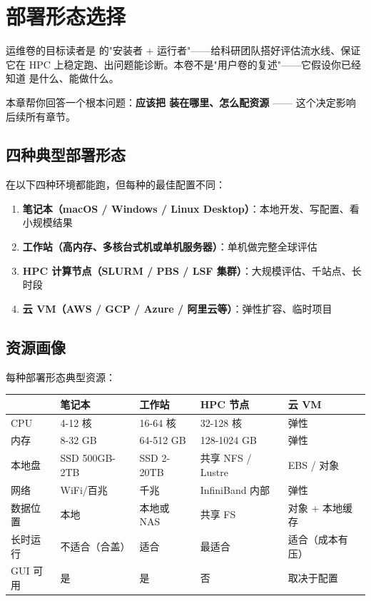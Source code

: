 
\chapter{部署形态选择}

运维卷的目标读者是 \openbench{} 的"安装者 + 运行者"——给科研团队搭好评估流水线、保证它在 HPC 上稳定跑、出问题能诊断。本卷不是"用户卷的复述"——它假设你已经知道 \openbench{} 是什么、能做什么。

本章帮你回答一个根本问题：\textbf{应该把 \openbench{} 装在哪里、怎么配资源} —— 这个决定影响后续所有章节。

\section{四种典型部署形态}

\openbench{} 在以下四种环境都能跑，但每种的最佳配置不同：

\begin{enumerate}
  \item \textbf{笔记本（macOS / Windows / Linux Desktop）}：本地开发、写配置、看小规模结果
  \item \textbf{工作站（高内存、多核台式机或单机服务器）}：单机做完整全球评估
  \item \textbf{HPC 计算节点（SLURM / PBS / LSF 集群）}：大规模评估、千站点、长时段
  \item \textbf{云 VM（AWS / GCP / Azure / 阿里云等）}：弹性扩容、临时项目
\end{enumerate}

\section{资源画像}

每种部署形态典型资源：

\begin{longtable}{p{2.4cm} p{2.4cm} p{2.4cm} p{2.4cm} p{2.4cm}}
  \toprule
  & 笔记本 & 工作站 & HPC 节点 & 云 VM \\
  \midrule
  \endhead
  CPU & 4-12 核 & 16-64 核 & 32-128 核 & 弹性 \\
  内存 & 8-32 GB & 64-512 GB & 128-1024 GB & 弹性 \\
  本地盘 & SSD 500GB-2TB & SSD 2-20TB & 共享 NFS / Lustre & EBS / 对象 \\
  网络 & WiFi/百兆 & 千兆 & InfiniBand 内部 & 弹性 \\
  数据位置 & 本地 & 本地或 NAS & 共享 FS & 对象 + 本地缓存 \\
  长时运行 & 不适合（合盖） & 适合 & 最适合 & 适合（成本有压） \\
  GUI 可用 & 是 & 是 & 否 & 取决于配置 \\
  \bottomrule
\end{longtable}

